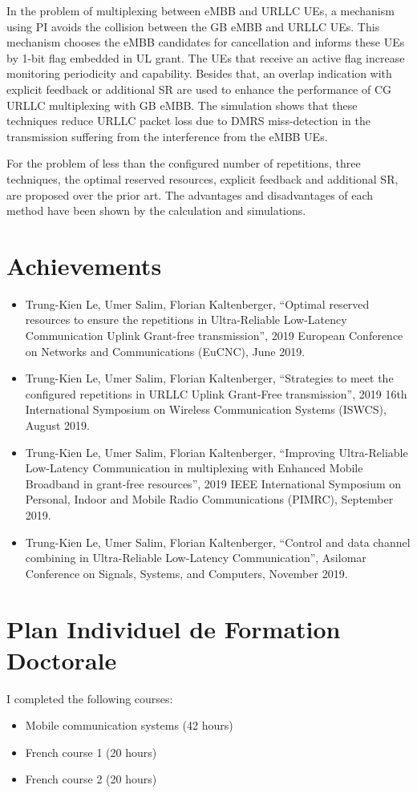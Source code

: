 \documentclass{report}
\begin{document}
In the problem of multiplexing between eMBB and URLLC UEs, a mechanism using PI avoids the collision between the GB eMBB and URLLC UEs. This mechanism chooses the eMBB candidates for cancellation and informs these UEs by 1-bit flag embedded in UL grant. The UEs that receive an active flag increase monitoring periodicity and capability. Besides that, an overlap indication with explicit feedback or additional SR are used to enhance the performance of CG URLLC multiplexing with GB eMBB. The simulation shows that these techniques reduce URLLC packet loss due to DMRS miss-detection in the transmission suffering from the interference from the eMBB UEs. 

For the problem of less than the configured number of repetitions, three techniques, the optimal reserved resources, explicit feedback and additional SR, are proposed over the prior art. The advantages and disadvantages of each method have been shown by the calculation and simulations. 

\section{Achievements}
\begin{itemize}
    \item  Trung-Kien Le, Umer Salim, Florian Kaltenberger, ``Optimal reserved resources to ensure the repetitions in Ultra-Reliable Low-Latency Communication Uplink Grant-free transmission'',  2019 European Conference on Networks and Communications (EuCNC), June 2019.
    \item Trung-Kien Le, Umer Salim, Florian Kaltenberger, ``Strategies to meet the configured repetitions in URLLC Uplink Grant-Free transmission'',  2019 16th International Symposium on Wireless Communication Systems (ISWCS), August 2019.
    \item Trung-Kien Le, Umer Salim, Florian Kaltenberger, ``Improving Ultra-Reliable Low-Latency Communication in multiplexing with Enhanced Mobile Broadband in grant-free resources'', 2019 IEEE International Symposium on Personal, Indoor and Mobile Radio Communications (PIMRC), September 2019.
    \item Trung-Kien Le, Umer Salim, Florian Kaltenberger, ``Control and data channel combining in Ultra-Reliable Low-Latency Communication'', Asilomar Conference on Signals, Systems, and Computers, November 2019.
\end{itemize}

\section{Plan Individuel de Formation Doctorale}
I completed the following courses:
\begin{itemize}
    \item Mobile communication systems (42 hours)
    \item French course 1 (20 hours)
    \item French course 2 (20 hours)
\end{itemize}
\end{document}
